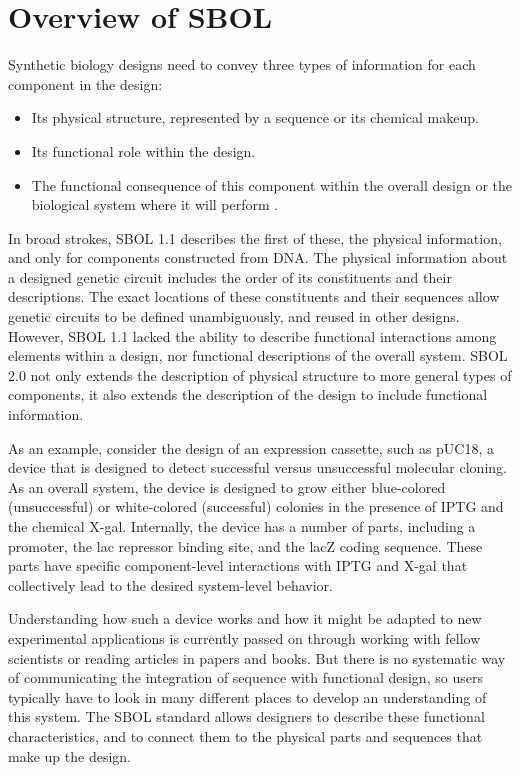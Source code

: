 \section{Overview of SBOL}
Synthetic biology designs need to convey three types of information for each component in the design:
\begin{itemize}
\item Its physical structure, represented by a sequence or its chemical makeup.
\item Its functional role within the design.
\item The functional consequence of this component within the overall design or the biological system where it will perform .
\end{itemize}
In broad strokes, SBOL 1.1 describes the first of these, the physical information, and only for components constructed from DNA. The physical information about a designed genetic circuit includes the order of its constituents and their descriptions. The exact locations of these constituents and their sequences allow genetic circuits to be defined unambiguously, and reused in other designs. However, SBOL 1.1 lacked the ability to describe functional interactions among elements within a design, nor functional descriptions of the overall system. SBOL 2.0 not only extends the description of physical structure to more general types of components, it also extends the description of the design to include functional information.

As an example, consider the design of an expression cassette, such as pUC18, a device that is designed to detect successful versus unsuccessful molecular cloning. As an overall system, the device is designed to grow either blue-colored (unsuccessful) or white-colored (successful) colonies in the presence of IPTG and the chemical X-gal. Internally, the device has a number of parts, including a promoter, the lac repressor binding site, and the lacZ coding sequence. These parts have specific component-level interactions with IPTG and X-gal that collectively lead to the desired system-level behavior. 

Understanding how such a device works and how it might be adapted to new experimental applications is currently passed on through working with fellow scientists or reading articles in papers and books. But there is no systematic way of communicating the integration of sequence with functional design, so users typically have to look in many different places to develop an understanding of this system.  
The SBOL standard allows designers to describe these functional characteristics, and to connect them to the physical parts and sequences that make up the design. 

